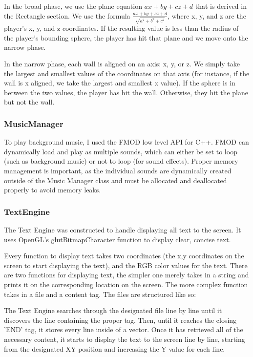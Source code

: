 \documentclass{article}
\begin{document}
In the broad phase, we use the plane equation $ax + by + cz + d$ that is derived in the Rectangle section. We use the formula $\frac{ax + by + cz + d}{\sqrt{a^2 + b^2 + c^2}}$, where x, y, and z are the player's x, y, and z coordinates. If the resulting value is less than the radius of the player's bounding sphere, the player has hit that plane and we move onto the narrow phase.

In the narrow phase, each wall is aligned on an axis: x, y, or z. We simply take the largest and smallest values of the coordinates on that axis (for instance, if the wall is x aligned, we take the largest and smallest x value). If the sphere is in between the two values, the player has hit the wall. Otherwise, they hit the plane but not the wall.

\subsubsection{MusicManager}
To play background music, I used the FMOD low level API for C++. FMOD can dynamically load and play as multiple sounds, which can either be set to loop (such as background music) or not to loop (for sound effects). Proper memory management is important, as the individual sounds are dynamically created outside of the Music Manager class and must be allocated and deallocated properly to avoid memory leaks.

\subsubsection{TextEngine}
The Text Engine was constructed to handle displaying all text to the screen. It uses OpenGL's glutBitmapCharacter function to display clear, concise text.

Every function to display text takes two coordinates (the x,y coordinates on the screen to start displaying the text), and the RGB color values for the text. There are two functions for displaying text, the simpler one merely takes in a string and prints it on the corresponding location on the screen. The more complex function takes in a file and a content tag. The files are structured like so:


	
The Text Engine searches through the designated file line by line until it discovers the line containing the proper tag. Then, until it reaches the closing 'END' tag, it stores every line inside of a vector. Once it has retrieved all of the necessary content, it starts to display the text to the screen line by line, starting from the designated XY position and increasing the Y value for each line.
\end{document}
